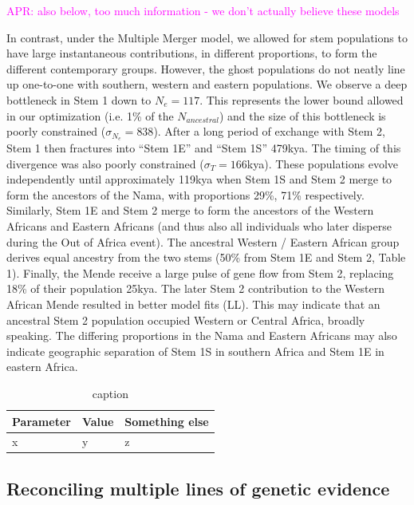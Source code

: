 \documentclass[]{article}
\newcommand{\aprcomment}[1]{{\textcolor{magenta}{APR: #1}}}
\begin{document}
\aprcomment{also below, too much information - we don't actually believe these
models}

In contrast, under the Multiple Merger model, we allowed for stem populations
to have large instantaneous contributions, in different proportions, to form
the different contemporary groups. However, the ghost populations do not neatly
line up one-to-one with southern, western and eastern populations. We observe a
deep bottleneck in Stem 1 down to $N_e=117$. This represents the lower bound
allowed in our optimization (i.e. 1\% of the $N_{ancestral}$) and the size of
this bottleneck is poorly constrained ($\sigma_{N_e}=838$). After a long period
of exchange with Stem 2, Stem 1 then fractures into “Stem 1E” and “Stem 1S”
479kya. The timing of this divergence was also poorly constrained ($\sigma_T=
166$kya). These populations evolve independently until approximately 119kya
when Stem 1S and Stem 2 merge to form the ancestors of the Nama, with
proportions 29\%, 71\% respectively. Similarly, Stem 1E and Stem 2 merge to
form the ancestors of the Western Africans and Eastern Africans (and thus also
all individuals who later disperse during the Out of Africa event). The
ancestral Western / Eastern African group derives equal ancestry from the two
stems (50\% from Stem 1E and Stem 2, Table 1). Finally, the Mende receive a
large pulse of gene flow from Stem 2, replacing 18\% of their population 25kya.
The later Stem 2 contribution to the Western African Mende resulted in better
model fits (LL). This may indicate that an ancestral Stem 2 population
occupied Western or Central Africa, broadly speaking. The differing proportions
in the Nama and Eastern Africans may also indicate geographic separation of
Stem 1S in southern Africa and Stem 1E in eastern Africa. 

\begin{table}
    \centering
    \begin{tabular}{l|l|l}
        \toprule
        Parameter & Value & Something else \\
        \midrule
        x & y & z \\
        \bottomrule
    \end{tabular}
    \caption{caption}
    \label{tab:migration-rates}
\end{table}

\subsection*{Reconciling multiple lines of genetic evidence}
\end{document}

